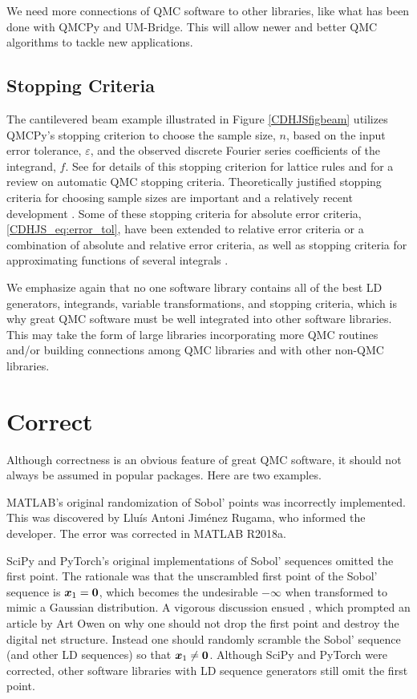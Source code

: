 \documentclass[graybox]{svmult}
\begin{document}
We need more connections of QMC software to other libraries, like what has been done with  QMCPy and UM-Bridge.  This will allow newer and better QMC algorithms to tackle new applications.

\subsection{Stopping Criteria}
The cantilevered beam example illustrated in Figure \ref{CDHJSfigbeam} utilizes QMCPy's stopping criterion to choose the sample size, $n$, based on the input error tolerance, $\varepsilon$, and the observed discrete Fourier series coefficients of the integrand, $f$.  See \cite{HicJim16a} for details of this stopping criterion for lattice rules and \cite{HicEtal18a} for a review on automatic QMC stopping criteria.  Theoretically justified stopping criteria for choosing sample sizes are important and a relatively recent development \cite{HicEtal14a,HicJim16a,JimHic16a,RatHic19a,JagHic22a}.  Some of these stopping criteria for absolute error criteria, \eqref{CDHJS_eq:error_tol},  have been extended to relative error criteria or a combination of absolute and relative error criteria, as well as stopping criteria for approximating functions of several integrals \cite{Jia16a,GilJim16b,HicEtal17a,JagSor23a}.


\bigskip

We emphasize again that no one software library contains all of the best LD generators, integrands, variable transformations, and stopping criteria, which is why great QMC software must be well integrated into other software libraries.  This may take the form of large libraries incorporating more QMC routines and/or building connections among QMC libraries and with other non-QMC libraries.


\section{Correct} \label{CDHJS_sec:correct}
Although correctness is an obvious feature of great QMC software, it should not always be assumed in popular packages.  Here are two examples.

MATLAB's original randomization of Sobol' points was incorrectly implemented.  This was discovered by Llu\'is Antoni Jim\'enez Rugama, who informed the developer.  The error was corrected in MATLAB R2018a.

SciPy and PyTorch's original implementations of Sobol' sequences omitted the first point.  The rationale was that the unscrambled first point of the Sobol' sequence is ${\boldsymbol{x}}_1 = {\boldsymbol{0}}$, which becomes the undesirable $\boldsymbol{-\infty}$ when transformed to mimic a Gaussian distribution.  A vigorous discussion ensued \cite{scipySobol2020a,pytorchSoboldiscussion2020a}, which prompted an article by Art Owen \cite{Owe22a} on why one should not drop the first point and destroy the digital net structure.  Instead one should randomly scramble the Sobol' sequence (and other LD sequences) so that ${\boldsymbol{x}}_1 \ne {\boldsymbol{0}}$.  Although SciPy and PyTorch were corrected, other software libraries with LD sequence generators still omit the first point.
\end{document}
